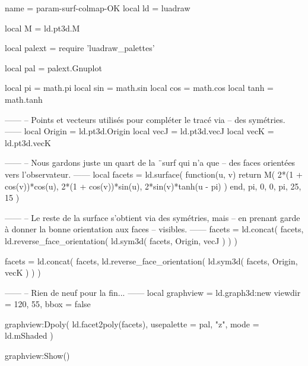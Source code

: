 \documentclass[border = 3pt]{standalone}
\begin{document}
\begin{luadraw*}{name = param-surf-colmap-OK}
local ld = luadraw

local M = ld.pt3d.M

local palext = require 'luadraw_palettes'

local pal = palext.Gnuplot

local pi   = math.pi
local sin  = math.sin
local cos  = math.cos
local tanh = math.tanh

------
-- Points et vecteurs utilisés pour compléter le tracé via
-- des symétries.
------
local Origin = ld.pt3d.Origin
local vecJ   = ld.pt3d.vecJ
local vecK   = ld.pt3d.vecK


------
-- Nous gardons juste un quart de la ¨surf qui n'a que
-- des faces orientées vers l'observateur.
------
local facets = ld.surface(
  function(u, v)
    return M(
      2*(1 + cos(v))*cos(u),
      2*(1 + cos(v))*sin(u),
      2*sin(v)*tanh(u - pi)
    )
  end,
  pi, 0, 0, pi,
  {25, 15}
)

------
-- Le reste de la surface s'obtient via des symétries, mais
-- en prenant garde à donner la bonne orientation aux faces
-- visibles.
------
facets = ld.concat(
  facets,
  ld.reverse_face_orientation(
    ld.sym3d(
      facets,
      {Origin, vecJ}
    )
  )
)

facets = ld.concat(
  facets,
  ld.reverse_face_orientation(
    ld.sym3d(
      facets,
      {Origin, vecK}
    )
  )
)

------
-- Rien de neuf pour la fin...
------
local graphview = ld.graph3d:new{
  viewdir = {120, 55},
  bbox    = false
}

graphview:Dpoly(
  ld.facet2poly(facets),
  {
    usepalette = {pal, "z"},
    mode       = ld.mShaded
  }
)

graphview:Show()
\end{luadraw*}
\end{document}
